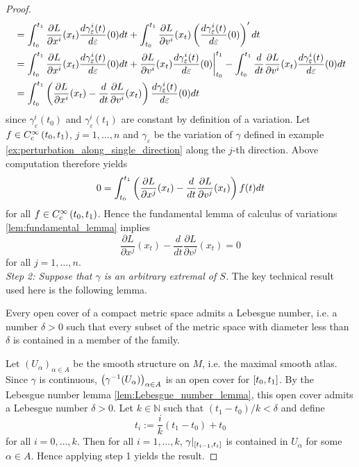 \begin{proof}
\begin{align*}
		&= \int_{t_0}^{t_1} \frac{\partial L}{\partial x^i}(x_t)\frac{d\gamma_\varepsilon^i(t)}{d\varepsilon}(0)dt + \int_{t_0}^{t_1}\frac{\partial L}{\partial v^i}(x_t)\del[3]{\frac{d\gamma_\varepsilon^i(t)}{d\varepsilon}(0)}'dt\\
		&= \int_{t_0}^{t_1} \frac{\partial L}{\partial x^i}(x_t)\frac{d\gamma_\varepsilon^i(t)}{d\varepsilon}(0)dt + \frac{\partial L}{\partial v^i}(x_t)\frac{d\gamma_\varepsilon^i(t)}{d\varepsilon}(0)\bigg\vert_{t_0}^{t_1} - \int_{t_0}^{t_1} \frac{d}{dt}\frac{\partial L}{\partial v^i}(x_t)\frac{d\gamma_\varepsilon^i(t)}{d\varepsilon}(0)dt\\
		&= \int_{t_0}^{t_1} \del[3]{\frac{\partial L}{\partial x^i}(x_t) - \frac{d}{dt}\frac{\partial L}{\partial v^i}(x_t)}\frac{d\gamma_\varepsilon^i(t)}{d\varepsilon}(0)dt 
	\end{align*}
	\noindent since $\gamma^i_\varepsilon(t_0)$ and $\gamma^i_\varepsilon(t_1)$ are constant by definition of a variation. Let $f \in C^\infty_c\intoo[0]{t_0,t_1}$, $j = 1,\dots,n$ and $\gamma_\varepsilon$ be the variation of $\gamma$ defined in example \ref{ex:perturbation_along_single_direction} along the $j$-th direction. Above computation therefore yields
	\begin{equation*}
		0 = \int_{t_0}^{t_1} \del[3]{\frac{\partial L}{\partial x^j}(x_t) - \frac{d}{dt}\frac{\partial L}{\partial v^j}(x_t)}f(t) dt
	\end{equation*}
	\noindent for all $f \in C^\infty_c\intoo[0]{t_0,t_1}$. Hence the fundamental lemma of calculus of variations \ref{lem:fundamental_lemma} implies
	\begin{equation*}
		\frac{\partial L}{\partial x^j}(x_t) - \frac{d}{dt}\frac{\partial L}{\partial v^j}(x_t) = 0
	\end{equation*}
	\noindent for all $j = 1,\dots,n$.\\
	\emph{Step 2: Suppose that $\gamma$ is an arbitrary extremal of $S$.} The key technical result used here is the following lemma.
	\begin{lemma}
		\label{lem:Lebesgue_number_lemma}
		Every open cover of a compact metric space admits a Lebesgue number, i.e. a number $\delta > 0$ such that every subset of the metric space with diameter less than $\delta$ is contained in a member of the family.
	\end{lemma}
	Let $(U_\alpha)_{\alpha \in A}$ be the smooth structure on $M$, i.e. the maximal smooth atlas. Since $\gamma$ is continuous, $\del[1]{\gamma^{-1}(U_\alpha)}_{\alpha \in A}$ is an open cover for $\intcc[0]{t_0,t_1}$. By the Lebesgue number lemma \ref{lem:Lebesgue_number_lemma}, this open cover admits a Lebesgue number $\delta > 0$. Let $k \in \mathbb{N}$ such that $(t_1 - t_0)/k < \delta$ and define
	\begin{equation*}
		t_i := \frac{i}{k}(t_1 - t_0) + t_0
	\end{equation*}
	\noindent for all $i = 0,\dots,k$. Then for all $i = 1,\dots,k$, $\gamma\vert_{\intcc[0]{t_{i - 1},t_i}}$ is contained in $U_\alpha$ for some $\alpha \in A$. Hence applying step 1 yields the result.
\end{proof}


